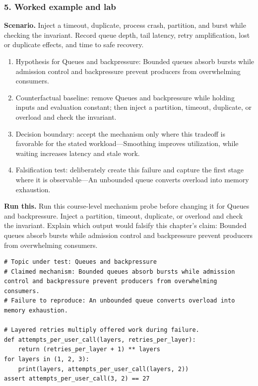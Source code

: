 \subsubsection*{5. Worked example and lab}
\textbf{Scenario.} Inject a timeout, duplicate, process crash, partition, and burst while checking the invariant. Record queue depth, tail latency, retry amplification, lost or duplicate effects, and time to safe recovery.
\begin{enumerate}
\item Hypothesis for Queues and backpressure: Bounded queues absorb bursts while admission control and backpressure prevent producers from overwhelming consumers.
\item Counterfactual baseline: remove Queues and backpressure while holding inputs and evaluation constant; then inject a partition, timeout, duplicate, or overload and check the invariant.
\item Decision boundary: accept the mechanism only where this tradeoff is favorable for the stated workload—Smoothing improves utilization, while waiting increases latency and stale work.
\item Falsification test: deliberately create this failure and capture the first stage where it is observable—An unbounded queue converts overload into memory exhaustion.
\end{enumerate}
\textbf{Run this.} Run this course-level mechanism probe before changing it for Queues and backpressure. Inject a partition, timeout, duplicate, or overload and check the invariant. Explain which output would falsify this chapter's claim: Bounded queues absorb bursts while admission control and backpressure prevent producers from overwhelming consumers.
\begin{Verbatim}[fontsize=\scriptsize]
# Topic under test: Queues and backpressure
# Claimed mechanism: Bounded queues absorb bursts while admission control and backpressure prevent producers from overwhelming consumers.
# Failure to reproduce: An unbounded queue converts overload into memory exhaustion.

# Layered retries multiply offered work during failure.
def attempts_per_user_call(layers, retries_per_layer):
    return (retries_per_layer + 1) ** layers
for layers in (1, 2, 3):
    print(layers, attempts_per_user_call(layers, 2))
assert attempts_per_user_call(3, 2) == 27
\end{Verbatim}
